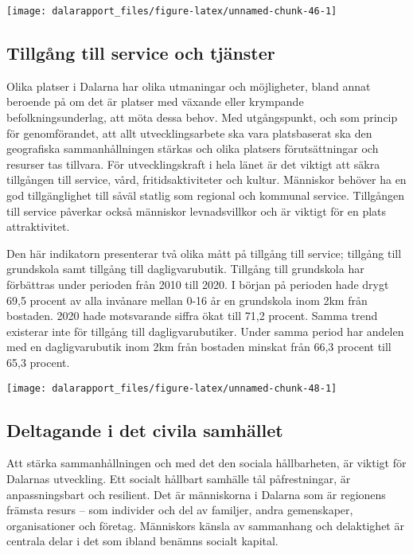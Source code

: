 \documentclass[
]{article}
\begin{document}
\begin{center}\texttt{[image: dalarapport\_files/figure-latex/unnamed-chunk-46-1]} \end{center}

\hypertarget{tillguxe5ng-till-service-och-tjuxe4nster}{%
\subsection{Tillgång till service och
tjänster}\label{tillguxe5ng-till-service-och-tjuxe4nster}}

Olika platser i Dalarna har olika utmaningar och möjligheter, bland
annat beroende på om det är platser med växande eller krympande
befolkningsunderlag, att möta dessa behov. Med utgångspunkt, och som
princip för genomförandet, att allt utvecklingsarbete ska vara
platsbaserat ska den geografiska sammanhållningen stärkas och olika
platsers förutsättningar och resurser tas tillvara. För utvecklingskraft
i hela länet är det viktigt att säkra tillgången till service, vård,
fritidsaktiviteter och kultur. Människor behöver ha en god
tillgänglighet till såväl statlig som regional och kommunal service.
Tillgången till service påverkar också människor levnadsvillkor och är
viktigt för en plats attraktivitet.

Den här indikatorn presenterar två olika mått på tillgång till service;
tillgång till grundskola samt tillgång till dagligvarubutik. Tillgång
till grundskola har förbättras under perioden från 2010 till 2020. I
början på perioden hade drygt 69,5 procent av alla invånare mellan 0-16
år en grundskola inom 2km från bostaden. 2020 hade motsvarande siffra
ökat till 71,2 procent. Samma trend existerar inte för tillgång till
dagligvarubutiker. Under samma period har andelen med en dagligvarubutik
inom 2km från bostaden minskat från 66,3 procent till 65,3 procent.

\begin{center}\texttt{[image: dalarapport\_files/figure-latex/unnamed-chunk-48-1]} \end{center}

\hypertarget{deltagande-i-det-civila-samhuxe4llet}{%
\subsection{Deltagande i det civila
samhället}\label{deltagande-i-det-civila-samhuxe4llet}}

Att stärka sammanhållningen och med det den sociala hållbarheten, är
viktigt för Dalarnas utveckling. Ett socialt hållbart samhälle tål
påfrestningar, är anpassningsbart och resilient. Det är människorna i
Dalarna som är regionens främsta resurs -- som individer och del av
familjer, andra gemenskaper, organisationer och företag. Människors
känsla av sammanhang och delaktighet är centrala delar i det som ibland
benämns socialt kapital.
\end{document}
